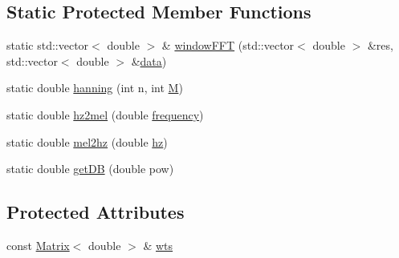 \subsection*{Static Protected Member Functions}
\begin{DoxyCompactItemize}
\item 
static std\+::vector$<$ double $>$ \& \hyperlink{class_feature_extractor_a4405d4256511c032ddc1a6bbd165d2d1}{window\+F\+F\+T} (std\+::vector$<$ double $>$ \&res, std\+::vector$<$ double $>$ \&\hyperlink{readwave_8h_aa12fa7025612e5f4774f2412dd7f465b}{data})
\item 
static double \hyperlink{class_feature_extractor_af32b291e5172d4c9d69086e581162423}{hanning} (int n, int \hyperlink{lpc2spec_8m_acdf5138e4a86bbc5f2b1c6f8f7bac5b5}{M})
\item 
static double \hyperlink{class_feature_extractor_a876f808984932a2ba034d92232385800}{hz2mel} (double \hyperlink{fft2melmx_8m_aa373cce97c03f128ec7d3a864adf1601}{frequency})
\item 
static double \hyperlink{class_feature_extractor_a25f7a96e78a673db662f359e84e4a7d8}{mel2hz} (double \hyperlink{bark2hz_8m_ad6db23495bdf397ae6cfadb27e7ffdcf}{hz})
\item 
static double \hyperlink{class_feature_extractor_a8dbc798d46b61fdd65cfc3e141cb8dac}{get\+D\+B} (double pow)
\end{DoxyCompactItemize}
\subsection*{Protected Attributes}
\begin{DoxyCompactItemize}
\item 
const \hyperlink{configure__basic_8h_a566a006016cf65b1b01bd2bc633e1c12}{Matrix}$<$ double $>$ \& \hyperlink{class_feature_extractor_a17a2527a302d35d02ed804166f08de42}{wts}
\end{DoxyCompactItemize}
